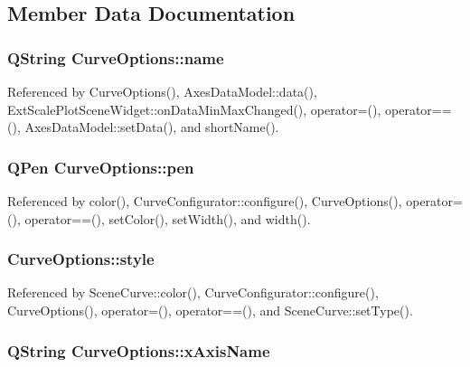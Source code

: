 \subsection{Member Data Documentation}
\subsubsection[{name}]{\setlength{\rightskip}{0pt plus 5cm}Q\+String Curve\+Options\+::name}\label{classCurveOptions_a7eadcb603b066065995d014d37b3f815}


Referenced by Curve\+Options(), Axes\+Data\+Model\+::data(), Ext\+Scale\+Plot\+Scene\+Widget\+::on\+Data\+Min\+Max\+Changed(), operator=(), operator==(), Axes\+Data\+Model\+::set\+Data(), and short\+Name().

\subsubsection[{pen}]{\setlength{\rightskip}{0pt plus 5cm}Q\+Pen Curve\+Options\+::pen}\label{classCurveOptions_a58cffc18ddac4304c7524fa2df217197}


Referenced by color(), Curve\+Configurator\+::configure(), Curve\+Options(), operator=(), operator==(), set\+Color(), set\+Width(), and width().

\subsubsection[{style}]{ Curve\+Options\+::style}\label{classCurveOptions_a756e3657edc83c38ff84da8ae19b1962}


Referenced by Scene\+Curve\+::color(), Curve\+Configurator\+::configure(), Curve\+Options(), operator=(), operator==(), and Scene\+Curve\+::set\+Type().

\subsubsection[{x\+Axis\+Name}]{\setlength{\rightskip}{0pt plus 5cm}Q\+String Curve\+Options\+::x\+Axis\+Name}\label{classCurveOptions_a89ea85abb7ad6d72036ce1f4620535e7}


